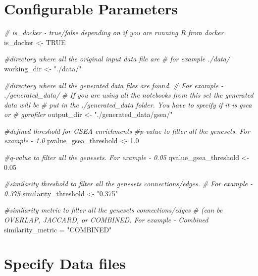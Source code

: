 \documentclass[
]{book}
\newenvironment{Shaded}{\begin{snugshade}}{\end{snugshade}}
\newcommand{\CommentTok}[1]{\textcolor[rgb]{0.56,0.35,0.01}{\textit{#1}}}
\newcommand{\ConstantTok}[1]{\textcolor[rgb]{0.56,0.35,0.01}{#1}}
\newcommand{\FloatTok}[1]{\textcolor[rgb]{0.00,0.00,0.81}{#1}}
\newcommand{\NormalTok}[1]{#1}
\newcommand{\OtherTok}[1]{\textcolor[rgb]{0.56,0.35,0.01}{#1}}
\newcommand{\StringTok}[1]{\textcolor[rgb]{0.31,0.60,0.02}{#1}}
\begin{document}
\hypertarget{configurable-parameters-2}{%
\section{Configurable Parameters}\label{configurable-parameters-2}}

\begin{Shaded}
\begin{Highlighting}[]
\CommentTok{\# is\_docker {-} true/false depending on if you are running R from docker}
\NormalTok{is\_docker }\OtherTok{\textless{}{-}} \ConstantTok{TRUE}

\CommentTok{\#directory where all the original input data file are}
\CommentTok{\# for example ./data/}
\NormalTok{working\_dir }\OtherTok{\textless{}{-}} \StringTok{"./data/"}


\CommentTok{\#directory where all the generated data files are found.}
\CommentTok{\# For example {-} ./generated\_data/}
\CommentTok{\# If you are using all the notebooks from this set the generated data will be}
\CommentTok{\# put in the ./generated\_data folder.  You have to specify if it is gsea or }
\CommentTok{\# gprofiler}
\NormalTok{output\_dir }\OtherTok{\textless{}{-}} \StringTok{"./generated\_data/gsea/"}


\CommentTok{\#defined threshold for GSEA enrichments }
\CommentTok{\#p{-}value to filter all the genesets.  For example {-}   1.0}
\NormalTok{pvalue\_gsea\_threshold }\OtherTok{\textless{}{-}} \FloatTok{1.0}

\CommentTok{\#q{-}value to filter all the genesets.  For example {-}   0.05}
\NormalTok{qvalue\_gsea\_threshold }\OtherTok{\textless{}{-}} \FloatTok{0.05}

\CommentTok{\#similarity threshold to filter all the genesets connections/edges.  }
\CommentTok{\# For example {-}   0.375}
\NormalTok{similarity\_threshold }\OtherTok{\textless{}{-}} \StringTok{"0.375"}

\CommentTok{\#similarity metric to filter all the genesets connections/edges }
\CommentTok{\# (can be OVERLAP, JACCARD, or COMBINED.   For example {-}   Combined}
\NormalTok{similarity\_metric }\OtherTok{=} \StringTok{"COMBINED"}
\end{Highlighting}
\end{Shaded}

\hypertarget{specify-data-files-1}{%
\section{Specify Data files}\label{specify-data-files-1}}
\end{document}
